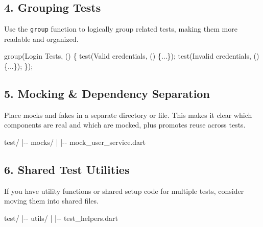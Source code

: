 \documentclass[
]{article}
\newenvironment{Shaded}{\begin{snugshade}}{\end{snugshade}}
\newcommand{\CommentTok}[1]{\textcolor[rgb]{0.48,0.49,0.49}{#1}}
\newcommand{\NormalTok}[1]{\textcolor[rgb]{0.81,0.81,0.76}{#1}}
\newcommand{\OperatorTok}[1]{\textcolor[rgb]{0.81,0.81,0.76}{#1}}
\newcommand{\StringTok}[1]{\textcolor[rgb]{0.96,0.31,0.31}{#1}}
\newcommand{\VariableTok}[1]{\textcolor[rgb]{0.15,0.68,0.68}{#1}}
\begin{document}
\subsection{4. Grouping Tests}\label{grouping-tests-2}

Use the \texttt{group} function to logically group related tests, making
them more readable and organized.

\begin{Shaded}
\begin{Highlighting}[]
\NormalTok{group(}\StringTok{\textquotesingle{}Login Tests\textquotesingle{}}\OperatorTok{,}\NormalTok{ () }\OperatorTok{\{}
\NormalTok{  test(}\StringTok{\textquotesingle{}Valid credentials\textquotesingle{}}\OperatorTok{,}\NormalTok{ () }\OperatorTok{\{...\}}\NormalTok{);}
\NormalTok{  test(}\StringTok{\textquotesingle{}Invalid credentials\textquotesingle{}}\OperatorTok{,}\NormalTok{ () }\OperatorTok{\{...\}}\NormalTok{);}
\OperatorTok{\}}\NormalTok{);}
\end{Highlighting}
\end{Shaded}

\subsection{5. Mocking \& Dependency
Separation}\label{mocking-dependency-separation}

Place mocks and fakes in a separate directory or file. This makes it
clear which components are real and which are mocked, plus promotes
reuse across tests.

\begin{Shaded}
\begin{Highlighting}[]
\VariableTok{test}\OperatorTok{/}
\OperatorTok{|}\CommentTok{{-}{-} mocks/}
\OperatorTok{|}   \OperatorTok{|}\CommentTok{{-}{-} mock\_user\_service.dart}
\end{Highlighting}
\end{Shaded}

\subsection{6. Shared Test Utilities}\label{shared-test-utilities}

If you have utility functions or shared setup code for multiple tests,
consider moving them into shared files.

\begin{Shaded}
\begin{Highlighting}[]
\VariableTok{test}\OperatorTok{/}
\OperatorTok{|}\CommentTok{{-}{-} utils/}
\OperatorTok{|}   \OperatorTok{|}\CommentTok{{-}{-} test\_helpers.dart}
\end{Highlighting}
\end{Shaded}
\end{document}
